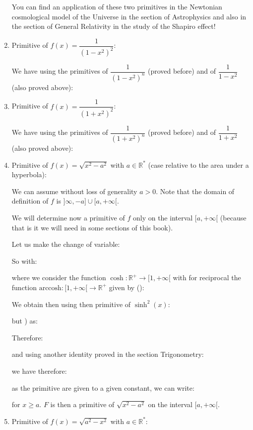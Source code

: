 \begin{enumerate}
		You can find an application of these two primitives in the Newtonian cosmological model of the Universe in the section of Astrophysics and also in the section of General Relativity in the study of the Shapiro effect!
		
		\item Primitive of $f(x)=\dfrac{1}{(1-x^2)^2}$:
		
		We have using the primitives of $\dfrac{1}{(1-x^2)^n}$ (proved before) and of $\dfrac{1}{1-x^2}$ (also proved above):
		
		
		\item Primitive of $f(x)=\dfrac{1}{(1+x^2)^2}$:
		
		We have using the primitives of $\dfrac{1}{(1+x^2)^n}$ (proved before) and of $\dfrac{1}{1+x^2}$ (also proved above):
		
		
		\item Primitive of $f(x)=\sqrt{x^2-a^2}$ with $a\in \mathbb{R}^*$ (case relative to the area under a hyperbola):
		
		We can assume without loss of generality $a>0$. Note that the domain of definition of $f$ is $]\infty,-a] \cup [a,+\infty[$.
		
		We will determine now a primitive of $f$ only on the interval $[a,+\infty[$ (because that is it we will need in some sections of this book).
		
		Let us make the change of variable:
		
		So with:
		
		where we consider the function $\cosh: \mathbb{R}^+ \rightarrow [1,+\infty[$ with for reciprocal the function $\text{arccosh}:[1,+\infty[ \rightarrow \mathbb{R}^+$ given by ():
		
		We obtain then using then primitive of $\sinh^2(x)$:
		
		but ) as:
		
		Therefore:
		
		and using another identity proved in the section Trigonometry:
		
		we have therefore:
		
		as the primitive are given to a given constant, we can write:
		
		for $x\geq a$. $F$ is then a primitive of $\sqrt{x^2-a^2}$ on the interval $[a,+\infty[$.
		
		\item Primitive of $f(x)=\sqrt{a^2-x^2}$ with $a\in \mathbb{R}^*$:
		

\end{enumerate}
